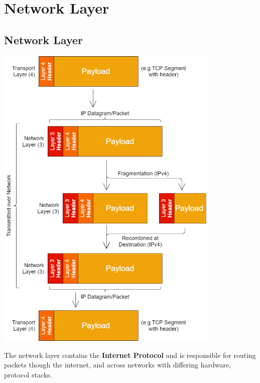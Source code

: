 \chapter{Network Layer}

\section{Network Layer}
\begin{center}\includegraphics[width=0.8\textwidth]{network_layer/images/network layer.png}\end{center}
The network layer contains the \textbf{Internet Protocol} and is responsible for routing packets though the internet, and across networks with differing hardware, protocol stacks.
